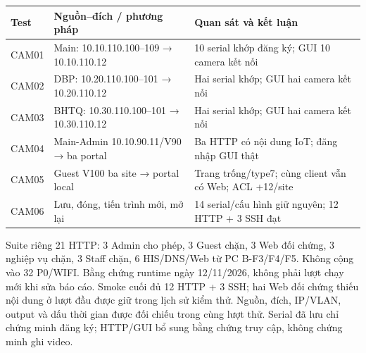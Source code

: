 \begin{tabularx}{\linewidth}{@{}lXX@{}}\toprule
Test & Nguồn--đích / phương pháp & Quan sát và kết luận\\\midrule
CAM01 & Main: 10.10.110.100--109 → 10.10.110.12 & 10 serial khớp đăng ký; GUI 10 camera kết nối\\
CAM02 & DBP: 10.20.110.100--101 → 10.20.110.12 & Hai serial khớp; GUI hai camera kết nối\\
CAM03 & BHTQ: 10.30.110.100--101 → 10.30.110.12 & Hai serial khớp; GUI hai camera kết nối\\
CAM04 & Main-Admin 10.10.90.11/V90 → ba portal & Ba HTTP có nội dung IoT; đăng nhập GUI thật\\
CAM05 & Guest V100 ba site → portal local & Trang trống/type7; cùng client vẫn có Web; ACL +12/site\\
CAM06 & Lưu, đóng, tiến trình mới, mở lại & 14 serial/cấu hình giữ nguyên; 12 HTTP + 3 SSH đạt\\\bottomrule\end{tabularx}

Suite riêng 21 HTTP: 3 Admin cho phép, 3 Guest chặn, 3 Web đối chứng, 3 nghiệp vụ chặn, 3 Staff chặn, 6 HIS/DNS/Web từ PC B-F3/F4/F5. Không cộng vào 32 P0/WIFI.
Bằng chứng runtime ngày 12/11/2026, không phải lượt chạy mới khi sửa báo cáo. Smoke cuối đủ 12 HTTP + 3 SSH; hai Web đối chứng thiếu nội dung ở lượt đầu được giữ trong lịch sử kiểm thử. Nguồn, đích, IP/VLAN, output và dấu thời gian được đối chiếu trong cùng lượt thử. Serial đã lưu chỉ chứng minh đăng ký; HTTP/GUI bổ sung bằng chứng truy cập, không chứng minh ghi video.
